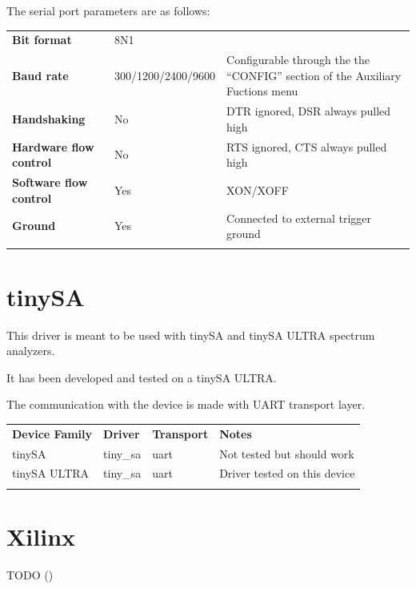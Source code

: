 The serial port parameters are as follows:

\begin{tabularx}{16cm}{llX}
\thickhline
\textbf{Bit format} & 8N1 & \\
\thickhline
\textbf{Baud rate} & 300/1200/2400/9600 & Configurable through the the ``CONFIG'' section of the Auxiliary Fuctions menu \\
\thickhline
\textbf{Handshaking} & No  & DTR ignored, DSR always pulled high \\
\thickhline
\textbf{Hardware flow control} & No & RTS ignored, CTS always pulled high \\
\thickhline
\textbf{Software flow control} & Yes & XON/XOFF \\
\thickhline
\textbf{Ground} & Yes & Connected to external trigger ground \\
\thichkhline
\end{tabularx}

\section{tinySA}

This driver is meant to be used with tinySA and tinySA ULTRA spectrum analyzers.

It has been developed and tested on a tinySA ULTRA.

The communication with the device is made with UART transport layer.

\begin{tabularx}{16cm}{lllX}
\thickhline
\textbf{Device Family} & \textbf{Driver} & \textbf{Transport} & \textbf{Notes} \\
\thickhline
tinySA  & tiny\_sa & uart & Not tested but should work \\
\thinhline
tinySA ULTRA & tiny\_sa & uart & Driver tested on this device \\
\thickhline
\end{tabularx}

\section{Xilinx}
TODO ()
